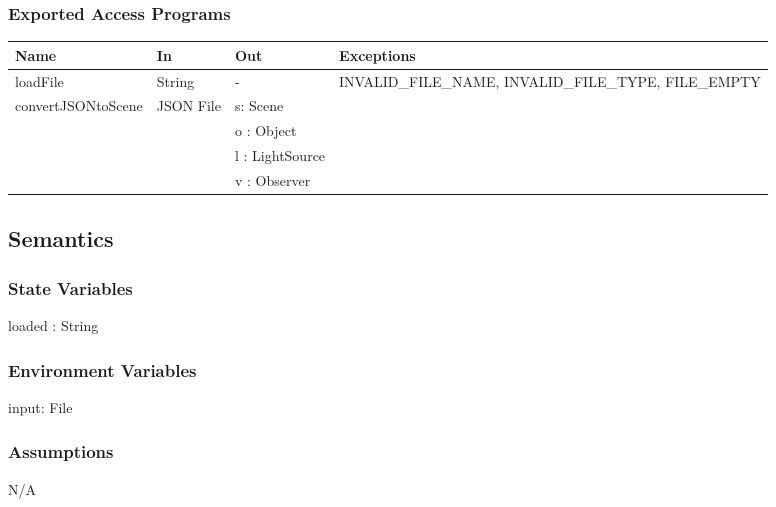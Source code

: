 \documentclass[12pt, titlepage]{article}
\begin{document}
\subsubsection{Exported Access Programs}
\begin{center}
	\begin{tabular}{p{4cm} p{2cm} p{2cm} p{4cm}}
		\hline
		\textbf{Name} & \textbf{In} & \textbf{Out} & \textbf{Exceptions} \\
		\hline
		loadFile & String & - & INVALID\_FILE\_NAME, INVALID\_FILE\_TYPE, 
		FILE\_EMPTY\\
		\multirow{4}{*}{convertJSONtoScene} & \multirow{4}{2cm}{JSON File} & s: 
		Scene & \\
		& & o : Object & \\
		& & l : LightSource & \\
		& & v : Observer & \\
		\hline
	\end{tabular}
\end{center}


\subsection{Semantics}
\subsubsection{State Variables}
loaded : String %

\subsubsection{Environment Variables}
input: File

\subsubsection{Assumptions}
N/A
\end{document}
